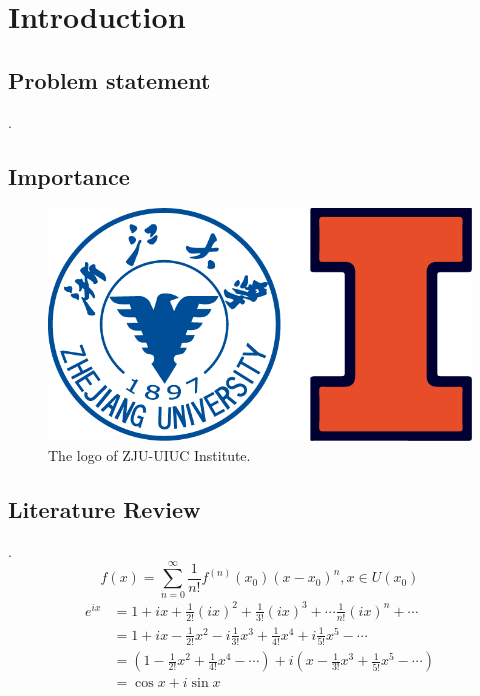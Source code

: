 \documentclass{zjui-report}
\begin{document}
\frontmatter
\makecoverpage %

\tableofcontents
\mainmatter

\chapter{Introduction}
\section{Problem statement}
\lipsum[1]\cite{li1999,haynes1951}.
\section{Importance}
\begin{figure}[H]
    \centering
    \includegraphics[width=0.4\linewidth]{LOGO2.png}
    \caption{The logo of ZJU-UIUC Institute.}
    \label{fig:logo}
\end{figure}

\section{Literature Review}
\lipsum[2]\cite{j.a.prufrock2009,li1999,ref1}.
\begin{equation}
    f\left( x \right) =\sum_{n=0}^{\infty}{\frac{1}{n!}f^{\left( n \right)}\left( x_0 \right) \left( x-x_0 \right) ^n}, x\in U\left( x_0 \right)
\end{equation}
\begin{equation}
    \begin{aligned}
        e^{ix} & =1+ix+\frac{1}{2!}\left( ix \right) ^2+\frac{1}{3!}\left( ix \right) ^3+\cdots \frac{1}{n!}\left( ix \right) ^n+\cdots
        \\
               & =1+ix-\frac{1}{2!}x^2-i\frac{1}{3!}x^3+\frac{1}{4!}x^4+i\frac{1}{5!}x^5-\cdots
        \\
               & =\left( 1-\frac{1}{2!}x^2+\frac{1}{4!}x^4-\cdots \right) +i\left( x-\frac{1}{3!}x^3+\frac{1}{5!}x^5-\cdots \right)
        \\
               & =\cos x+i\sin x
    \end{aligned}
\end{equation}
\end{document}
